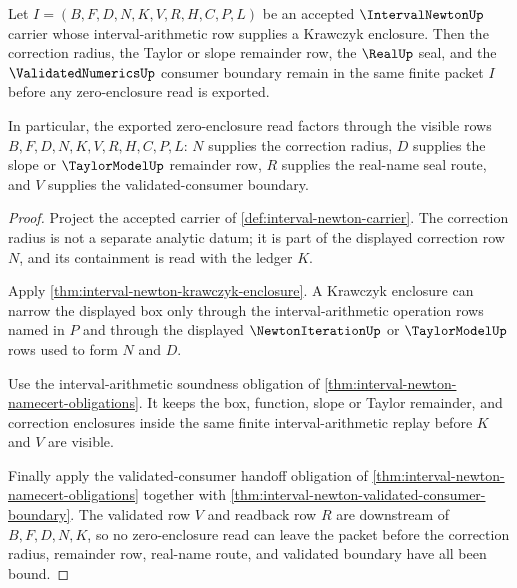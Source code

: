 \begin{theorem}
\label{thm:interval-newton-krawczyk-radius-lock}
Let $I=(B,F,D,N,K,V,R,H,C,P,L)$ be an accepted $\IntervalNewtonUp$ carrier whose interval-arithmetic row supplies a Krawczyk enclosure. Then the correction radius, the Taylor or slope remainder row, the $\RealUp$ seal, and the $\ValidatedNumericsUp$ consumer boundary remain in the same finite packet $I$ before any zero-enclosure read is exported.

In particular, the exported zero-enclosure read factors through the visible rows $B,F,D,N,K,V,R,H,C,P,L$: $N$ supplies the correction radius, $D$ supplies the slope or $\TaylorModelUp$ remainder row, $R$ supplies the real-name seal route, and $V$ supplies the validated-consumer boundary.
\end{theorem}
\begin{proof}
Project the accepted carrier of \autoref{def:interval-newton-carrier}. The correction radius is not a separate analytic datum; it is part of the displayed correction row $N$, and its containment is read with the ledger $K$.

Apply \autoref{thm:interval-newton-krawczyk-enclosure}. A Krawczyk enclosure can narrow the displayed box only through the interval-arithmetic operation rows named in $P$ and through the displayed $\NewtonIterationUp$ or $\TaylorModelUp$ rows used to form $N$ and $D$.

Use the interval-arithmetic soundness obligation of \autoref{thm:interval-newton-namecert-obligations}. It keeps the box, function, slope or Taylor remainder, and correction enclosures inside the same finite interval-arithmetic replay before $K$ and $V$ are visible.

Finally apply the validated-consumer handoff obligation of \autoref{thm:interval-newton-namecert-obligations} together with \autoref{thm:interval-newton-validated-consumer-boundary}. The validated row $V$ and readback row $R$ are downstream of $B,F,D,N,K$, so no zero-enclosure read can leave the packet before the correction radius, remainder row, real-name route, and validated boundary have all been bound.
\end{proof}

